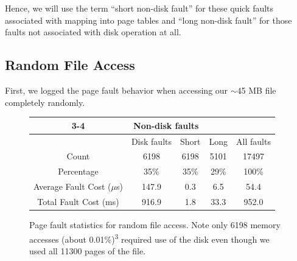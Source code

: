 \documentclass{article}
\begin{document}
	Hence, we will use the term ``short non-disk fault'' for these quick faults associated with mapping into page tables and ``long non-disk fault'' for those faults not associated with disk operation at all.

\subsection{Random File Access}

	First, we logged the page fault behavior when accessing our $\sim$45 MB file completely randomly.
	
	\begin{figure}[ht!]
		\centering
		\begin{tabular}{|c|c|c|c|c|}
			\cline{3-4}\multicolumn{2}{}{}&\multicolumn{2}{|c|}{Non-disk faults}\\
			\hline & Disk faults & Short & Long & All faults\\\hline
			Count & 6198 & 6198 & 5101 & 17497\\
			Percentage & 35\% & 35\% & 29\% & 100\% \\
			Average Fault Cost ($\mu$s) & 147.9 & 0.3 & 6.5 & 54.4\\
			Total Fault Cost (ms)\footnotemark[2] & 916.9 & 1.8 & 33.3 & 952.0 \\\hline
		\end{tabular}
		\caption{Page fault statistics for random file access. Note only 6198 memory accesses (about 0.01\%)\textsuperscript{3} required use of the disk even though we used all 11300 pages of the file.}
	\end{figure}
\end{document}

